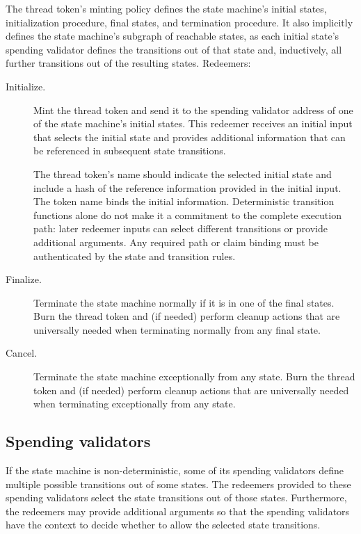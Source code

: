 \documentclass[../midgard.tex]{subfiles}
\begin{document}
The thread token's minting policy defines the state machine's initial states, initialization procedure, final states, and termination procedure.
It also implicitly defines the state machine's subgraph of reachable states, as each initial state's spending validator defines the transitions out of that state and, inductively, all further transitions out of the resulting states.
Redeemers:

\begin{description}
    \item[Initialize.] Mint the thread token and send it to the spending validator address of one of the state machine's initial states.
      This redeemer receives an initial input that selects the initial state and provides additional information that can be referenced in subsequent state transitions.
    
    The thread token's name should indicate the selected initial state and include a hash of the reference information provided in the initial input.
    The token name binds the initial information. Deterministic transition functions alone do not make it a commitment to the complete execution path: later redeemer inputs can select different transitions or provide additional arguments. Any required path or claim binding must be authenticated by the state and transition rules.
    
    \item[Finalize.] Terminate the state machine normally if it is in one of the final states.
      Burn the thread token and (if needed) perform cleanup actions that are universally needed when terminating normally from any final state.
    
    \item[Cancel.] Terminate the state machine exceptionally from any state.
      Burn the thread token and (if needed) perform cleanup actions that are universally needed when terminating exceptionally from any state.
\end{description}

\subsection{Spending validators}
\label{h:single-threaded-state-machine-spending-validators}

If the state machine is non-deterministic, some of its spending validators define multiple possible transitions out of some states.
The redeemers provided to these spending validators select the state transitions out of those states.
Furthermore, the redeemers may provide additional arguments so that the spending validators have the context to decide whether to allow the selected state transitions.
\end{document}
